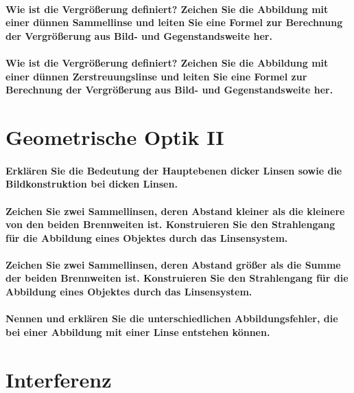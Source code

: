 \documentclass[a4paper, 11pt, parskip=half]{scrartcl}
\begin{document}
\paragraph{Wie ist die Vergrößerung definiert? Zeichen Sie die Abbildung mit einer dünnen
Sammellinse und leiten Sie eine Formel zur Berechnung der Vergrößerung aus Bild- und
Gegenstandsweite her.}

\paragraph{Wie ist die Vergrößerung definiert? Zeichen Sie die Abbildung mit einer dünnen
Zerstreuungslinse und leiten Sie eine Formel zur Berechnung der Vergrößerung aus Bild- und
Gegenstandsweite her.}

\newpage

\section{Geometrische Optik II}

\paragraph{Erklären Sie die Bedeutung der Hauptebenen dicker Linsen sowie die Bildkonstruktion bei
dicken Linsen.}

\paragraph{Zeichen Sie zwei Sammellinsen, deren Abstand kleiner als die kleinere von den beiden
Brennweiten ist. Konstruieren Sie den Strahlengang für die Abbildung eines Objektes durch
das Linsensystem.}

\paragraph{Zeichen Sie zwei Sammellinsen, deren Abstand größer als die Summe der beiden
Brennweiten ist. Konstruieren Sie den Strahlengang für die Abbildung eines Objektes durch
das Linsensystem.}

\paragraph{Nennen und erklären Sie die unterschiedlichen Abbildungsfehler, die bei einer Abbildung
mit einer Linse entstehen können.}

\newpage
\section{Interferenz}
\end{document}
